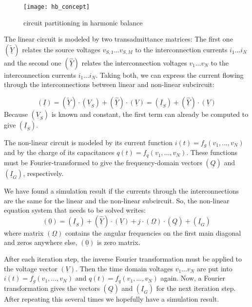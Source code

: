 \begin{figure}[ht]
\begin{center}
\texttt{[image: hb\_concept]}
\end{center}
\caption{circuit partitioning in harmonic balance}
\label{fig:hb_concept}
\end{figure}
\FloatBarrier

The linear circuit is modeled by two transadmittance matrices:
The first one $(\tilde{\underline{Y}})$
relates the source voltages $v_{S,1}...v_{S,M}$ to the interconnection
currents $i_1...i_N$ and the second one $(\hat{\underline{Y}})$
relates the interconnection
voltages $v_1...v_N$ to the interconnection currents $i_1...i_N$.
Taking both, we can express the current flowing through the
interconnections between linear and non-linear subcircuit:

\begin{equation}
\label{eqn:HBlin}
(\underline{I})
  = (\underline{\tilde{Y}})\cdot (\underline{V}_S) + (\underline{\hat{Y}})\cdot (\underline{V})
  = (\underline{I}_S) + (\underline{\hat{Y}})\cdot (\underline{V})
\end{equation}
Because $(\underline{V}_S)$ is known and constant, the first term
can already be computed to give $(\underline{I}_S)$.

\addvspace{12pt}

The non-linear circuit is modeled by its current function
$i(t) = f_g(v_1, ..., v_N)$
and by the charge of its capacitances
$q(t) = f_q(v_1, ..., v_N)$.
These functions must be Fourier-transformed to give the
frequency-domain vectors $(\underline{Q})$ and $(\underline{I}_G)$,
respectively.

\addvspace{12pt}

We have found a simulation result if the currents through the
interconnections are the same for the linear and the non-linear
subcircuit. So, the non-linear equation system that needs to be
solved writes:
\begin{equation}
(\underline{0})
  = (\underline{I}_S) + (\underline{\hat{Y}})\cdot (\underline{V})
    + j\cdot (\underline{\Omega})\cdot (\underline{Q}) + (\underline{I}_G)
\end{equation}
where matrix $(\underline{\Omega})$ contains the angular frequencies
on the first main diagonal and zeros anywhere else, $(\underline{0})$
is zero matrix.

\addvspace{12pt}

After each iteration step, the inverse Fourier transformation must
be applied to the voltage vector $(\underline{V})$. Then the time domain
voltages $v_1...v_N$ are put into $i(t) = f_g(v_1, ..., v_N)$
and $q(t) = f_q(v_1, ..., v_N)$ again. Now, a Fourier transformation
gives the vectors $(\underline{Q})$ and $(\underline{I}_G)$ for the
next iteration step. After repeating this several times we hopefully
have a simulation result.

